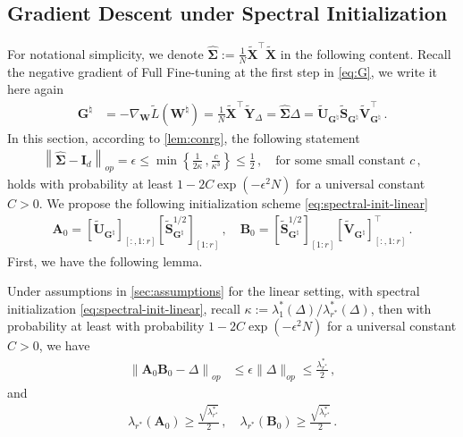 \subsection{Gradient Descent under Spectral Initialization}
\label{app:lrspec}
For notational simplicity, we denote $\widehat{\bm \Sigma} := \frac{1}{N}\widetilde{\bm X}^{\!\top}\widetilde{\bm X}$ in the following content. Recall the negative gradient of Full Fine-tuning at the first step in \cref{eq:G}, we write it here again
\begin{align}
\label{NGG}
  {\bm G}^{\natural} & = -\nabla_{\bm W} \widetilde{L}(\bm W^\natural) = \frac{1}{N}\widetilde{\bm X}^{\!\top}\widetilde{\bm Y}_{\Delta} = \widehat{\bm \Sigma}\Delta = \widetilde{\bm U}_{\bm G^\natural}\widetilde{\bm S}_{\bm G^\natural}\widetilde{\bm V}_{\bm G^\natural}^{\!\top}\,.
\end{align}
In this section, according to \cref{lem:conrg}, the following statement 
\begin{align}
\label{concentration-N}
    \left\|\widehat{\bm \Sigma} - \bm I_d\right\|_{op}=\epsilon \leq \min\left\{\frac{1}{2\kappa}\,,\frac{c}{\kappa^3}\right\} \leq \frac{1}{2} \,, \quad \mbox{for some small constant $c$}\,,
\end{align}
holds with probability at least $1- 2C\exp(-\epsilon^2 N)$ for a universal constant $C>0$. We propose the following initialization scheme \eqref{eq:spectral-init-linear}
\begin{align*}
    \bm A_0 = \left[\widetilde{\bm U}_{\bm G^\natural}\right]_{[:,1:r]}\left[\widetilde{\bm S}_{\bm G^\natural}^{1/2}\right]_{[1:r]}\,,\quad \bm B_0 = \left[\widetilde{\bm S}_{\bm G^\natural}^{1/2}\right]_{[1:r]}\left[\widetilde{\bm V}_{\bm G^\natural}\right]_{[:,1:r]}^{\!\top}\,.
\end{align*}
First, we have the following lemma.
\begin{lemma}
\label{linear-initial-risk}
Under assumptions in \cref{sec:assumptions} for the linear setting, with spectral initialization \eqref{eq:spectral-init-linear}, recall $\kappa := \lambda_1^*(\Delta) / \lambda_{r^*}^*(\Delta)$, then with probability at least with probability $1- 2C\exp(-\epsilon^2 N)$ for a universal constant $C>0$, we have
    \begin{align}
        \left\|\bm A_0 \bm B_0 - \Delta\right\|_{op} & \leq \epsilon \| \Delta \|_{op} \leq \frac{\lambda_{r^*}^*}{2} \label{spectral_linear_risk_initial}\,,
    \end{align}
    and
    \begin{align}
        \lambda_{r^*}\left(\bm A_0\right)\geq \frac{\sqrt{\lambda_{r^*}^*}}{2}\,,\quad \lambda_{r^*}\left(\bm B_0\right)\geq \frac{\sqrt{\lambda_{r^*}^*}}{2}\label{initial-smallest-singular-values-linear}\,.
    \end{align}
\end{lemma}
